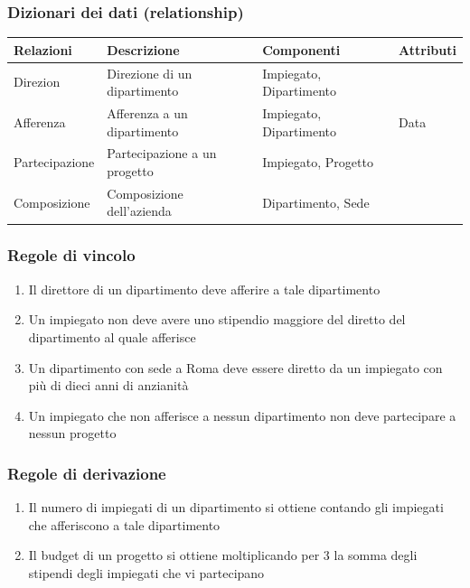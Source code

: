\subsubsection*{Dizionari dei dati (relationship)} 
\begin{center}
	\begin{tabular}{ |l|l|l|l| } 
		\hline
		\textbf{Relazioni} & \textbf{Descrizione} & \textbf{Componenti} & \textbf{Attributi}\\
		\hline
		Direzion & Direzione di un dipartimento & Impiegato, Dipartimento & \\
		\hline
		Afferenza & Afferenza a un dipartimento & Impiegato, Dipartimento & Data\\
		\hline
		Partecipazione & Partecipazione a un progetto & Impiegato, Progetto & \\
		\hline
		Composizione & Composizione dell'azienda & Dipartimento, Sede & \\
		\hline
	\end{tabular}
\end{center}
\subsubsection*{Regole di vincolo}
\begin{enumerate}
	\item Il direttore di un dipartimento deve afferire a tale dipartimento
	\item Un impiegato non deve avere uno stipendio maggiore del diretto del dipartimento al quale afferisce
	\item Un dipartimento con sede a Roma deve essere diretto da un impiegato con più di dieci anni di anzianità
	\item Un impiegato che non afferisce a nessun dipartimento non deve partecipare a nessun progetto
\end{enumerate}
\subsubsection*{Regole di derivazione}
\begin{enumerate}
	\item Il numero di impiegati di un dipartimento si ottiene contando gli impiegati che afferiscono a tale dipartimento
	\item Il budget di un progetto si ottiene moltiplicando per 3 la somma degli stipendi degli impiegati che vi partecipano
\end{enumerate}


